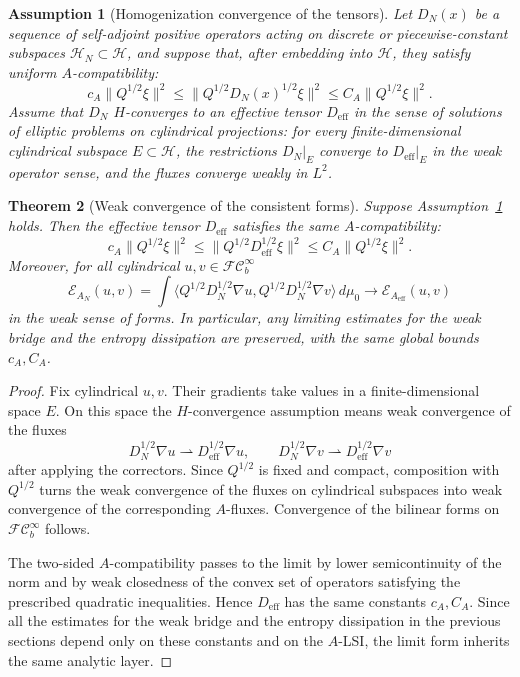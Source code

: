 \documentclass{article}
\newtheorem{theorem}{Theorem}[section]
\newtheorem{assumption}[theorem]{Assumption}
\newcommand{\Hh}{\mathcal H}
\newcommand{\FC}{\mathcal{FC}_b^\infty}
\begin{document}
\begin{assumption}[Homogenization convergence of the tensors]
\label{ass:homogenization-DN}
Let \(D_N(x)\) be a sequence of self-adjoint positive operators acting on
discrete or piecewise-constant subspaces \(\Hh_N\subset\Hh\), and suppose that,
after embedding into \(\Hh\), they satisfy uniform \(A\)-compatibility:
\[
        c_A\|Q^{1/2}\xi\|^2
        \le
        \|Q^{1/2}D_N(x)^{1/2}\xi\|^2
        \le
        C_A\|Q^{1/2}\xi\|^2 .
\]
Assume that \(D_N\) \(H\)-converges to an effective tensor
\(D_{\mathrm{eff}}\) in the sense of solutions of elliptic problems on
cylindrical projections: for every finite-dimensional cylindrical subspace
\(E\subset\Hh\), the restrictions \(D_N|_E\) converge to
\(D_{\mathrm{eff}}|_E\) in the weak operator sense, and the fluxes converge
weakly in \(L^2\).
\end{assumption}

\begin{theorem}[Weak convergence of the consistent forms]
\label{thm:homogenization-A}
Suppose Assumption~\ref{ass:homogenization-DN} holds. Then the effective
tensor \(D_{\mathrm{eff}}\) satisfies the same \(A\)-compatibility:
\[
        c_A\|Q^{1/2}\xi\|^2
        \le
        \|Q^{1/2}D_{\mathrm{eff}}^{1/2}\xi\|^2
        \le
        C_A\|Q^{1/2}\xi\|^2 .
\]
Moreover, for all cylindrical \(u,v\in\FC\)
\[
        \mathcal E_{A_N}(u,v)
        =
        \int\langle Q^{1/2}D_N^{1/2}\nabla u,
        Q^{1/2}D_N^{1/2}\nabla v\rangle\,d\mu_0
        \longrightarrow
        \mathcal E_{A_{\mathrm{eff}}}(u,v)
\]
in the weak sense of forms. In particular, any limiting estimates for the weak
bridge and the entropy dissipation are preserved, with the same global bounds
\(c_A,C_A\).
\end{theorem}

\begin{proof}
Fix cylindrical \(u,v\). Their gradients take values in a finite-dimensional
space \(E\). On this space the \(H\)-convergence assumption means weak
convergence of the fluxes
\[
        D_N^{1/2}\nabla u \rightharpoonup
        D_{\mathrm{eff}}^{1/2}\nabla u,
        \qquad
        D_N^{1/2}\nabla v \rightharpoonup
        D_{\mathrm{eff}}^{1/2}\nabla v
\]
after applying the correctors. Since \(Q^{1/2}\) is fixed and compact,
composition with \(Q^{1/2}\) turns the weak convergence of the fluxes on
cylindrical subspaces into weak convergence of the corresponding
\(A\)-fluxes. Convergence of the bilinear forms on \(\FC\) follows.

The two-sided \(A\)-compatibility passes to the limit by lower semicontinuity
of the norm and by weak closedness of the convex set of operators satisfying
the prescribed quadratic inequalities. Hence \(D_{\mathrm{eff}}\) has the same
constants \(c_A,C_A\). Since all the estimates for the weak bridge and the
entropy dissipation in the previous sections depend only on these constants
and on the \(A\)-LSI, the limit form inherits the same analytic layer.
\end{proof}
\end{document}
